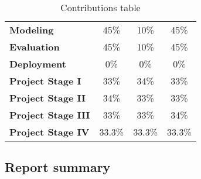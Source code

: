 \begin{table}[h!]
\begin{tabular}{|l||c|c|c|}
    \textbf{Modeling}               & 45\%                                                                     & 10\%                                                                      & 45\%                                                                   \\
    \textbf{Evaluation}             & 45\%                                                                     & 10\%                                                                      & 45\%                                                                   \\
    \textbf{Deployment}             & 0\%                                                                      & 0\%                                                                       & 0\%                                                                    \\
    \midrule
    \textbf{Project Stage I}        & 33\%                                                                     & 34\%                                                                      & 33\%                                                                   \\
    \textbf{Project Stage II}       & 34\%                                                                     & 33\%                                                                      & 33\%                                                                   \\
    \textbf{Project Stage III}      & 33\%                                                                     & 33\%                                                                      & 34\%                                                                   \\
    \textbf{Project Stage IV}       & 33.3\%                                                                   & 33.3\%                                                                    & 33.3\%                                                                 \\
    \bottomrule
  \end{tabular}
  \caption{Contributions table}\label{tab:contributions}
\end{table}



\subsection{Report summary}

